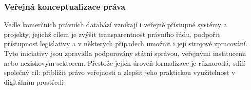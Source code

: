 
\subsubsection{Veřejná konceptualizace práva}
\label{verejna_konceptualizace}

Vedle komerčních právních databází vznikají i veřejně přístupné systémy a projekty, jejichž cílem je zvýšit transparentnost právního řádu, podpořit přístupnost legislativy a v některých případech umožnit i její strojové zpracování. Tyto iniciativy jsou zpravidla podporovány státní správou, veřejnými institucemi nebo neziskovým sektorem. Přestože jejich úroveň formalizace je různorodá, sdílí společný cíl: přiblížit právo veřejnosti a zlepšit jeho praktickou využitelnost v digitálním prostředí.

